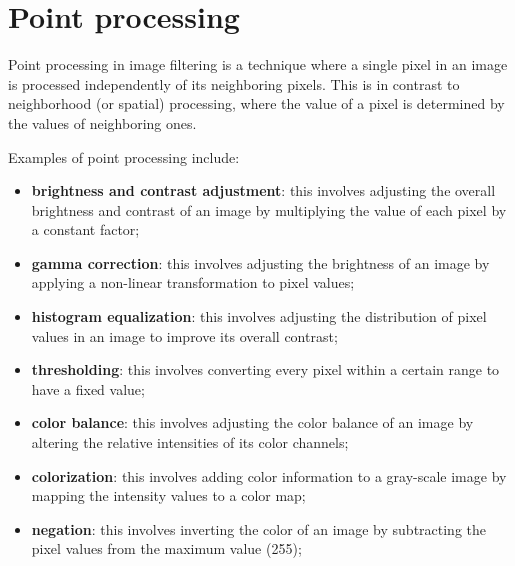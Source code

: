 \documentclass{article}
\begin{document}
\begin{center}
\end{center}

\newpage

\section*{Point processing}

Point processing in image filtering is a technique where a single pixel in an image is processed independently of its neighboring pixels. This is in contrast to neighborhood (or spatial) processing, where the value of a pixel is determined by the values of neighboring ones.

Examples of point processing include:
\begin{itemize}
    \item \textbf{brightness and contrast adjustment}: this involves adjusting the overall brightness and contrast of an image by multiplying the value of each pixel by a constant factor;
    \item \textbf{gamma correction}: this involves adjusting the brightness of an image by applying a non-linear transformation to pixel values;
    \item \textbf{histogram equalization}: this involves adjusting the distribution of pixel values in an image to improve its overall contrast;
    \item \textbf{thresholding}: this involves converting every pixel within a certain range to have a fixed value;
    \item \textbf{color balance}: this involves adjusting the color balance of an image by altering the relative intensities of its color channels;
    \item \textbf{colorization}: this involves adding color information to a gray-scale image by mapping the intensity values to a color map;
    \item \textbf{negation}: this involves inverting the color of an image by subtracting the pixel values from the maximum value (255);
\end{itemize}
\end{document}
